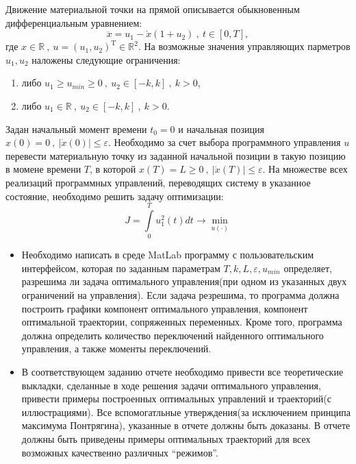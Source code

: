 \documentclass[10pt]{article}
\begin{document}
Движение материальной точки на прямой описывается обыкновенным дифференциальным уравнением:
\begin{equation} \label{dif_equation}
	 \ddot{x} = u_1 - \dot{x}(1 + u_2) \ , \ t \in [0,T], 
\end{equation}
где \( x \in \mathbb{R} \ , \ u = (u_1, u_2)^{\text{T}} \in \mathbb{R}^2 \). На возможные значения управляющих парметров \( u_1, u_2 \) наложены следующие ограничения:
\begin{enumerate}
	\item либо \( u_1 \ge u_{min} \ge 0 \ , \ u_2 \in [-k,k] \ , \ k > 0 \),
	\item либо \( u_1 \in \mathbb{R} \ , \ u_2 \in [-k,k] \ , \ k > 0\).
\end{enumerate}
Задан начальный момент времени \( t_0 = 0 \) и начальная позиция \( x(0) = 0 \ , \ |\dot{x}(0)| \le \varepsilon \). Необходимо за счет выбора программного управления \( u \)  перевести материальную точку из заданной начальной позиции в такую позицию в момене времени \( T \), в которой \( x(T) = L \ge 0 \ , \ |\dot{x}(T)| \le \varepsilon \). На множестве всех реализаций программных управлений, переводящих систему в указанное состояние, необходимо решить задачу оптимизации:
\[ J = \int\limits_0^T u_1^2(t)dt \to \min\limits_{u(\cdot)} \]
\begin{itemize}
\item Необходимо написать в среде MatLab программу с пользовательским интерфейсом, которая по заданным параметрам \( T, k, L, \varepsilon, u_{min} \) определяет, разрешима ли задача оптимального управления(при одном из указанных двух ограничений на управления). Если задача резрешима, то программа должна построить графики компонент оптимального управления, компонент оптимальной траектории, сопряженных переменных. Кроме того, программа должна определить количество переключений найденного оптимального управления, а также моменты переключений.
\item В соответствующем заданию отчете необходимо привести все теоретические выкладки, сделанные в ходе решения задачи оптимального управления, привести примеры построенных оптимальных управлений и траекторий(с иллюстрациями). Все вспомогатльные утверждения(за исключением принципа максимума Понтрягина), указанные в отчете должны быть доказаны. В отчете должны быть приведены примеры оптимальных траекторий для всех возможных качественно различных ``режимов''.
\end{itemize}
\end{document}
